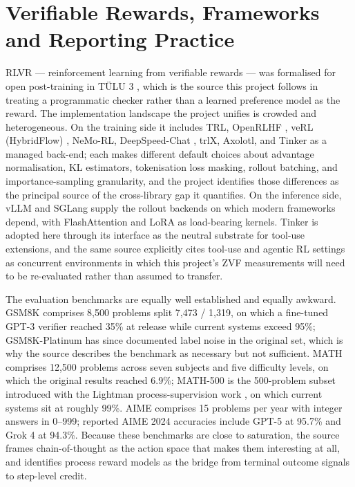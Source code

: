\documentclass[12pt,a4paper]{report}
\DeclareRobustCommand{\longtok}[1]{\texttt{\seqsplit{#1}}}
\begin{document}
\section{Verifiable Rewards, Frameworks and Reporting
Practice}\label{verifiable-rewards-frameworks-and-reporting-practice}

RLVR --- reinforcement learning from verifiable rewards --- was
formalised for open post-training in TÜLU 3 \citep{lambert2024tulu3},
which is the source this project follows in treating a programmatic
checker rather than a learned preference model as the reward. The
implementation landscape the project unifies is crowded and
heterogeneous. On the training side it includes TRL, OpenRLHF
\citep{hu2024openrlhf}, veRL (HybridFlow) \citep{sheng2025hybridflow},
NeMo-RL, DeepSpeed-Chat \citep{yao2023deepspeedchat}, trlX, Axolotl, and
Tinker as a managed back-end; each makes different default choices about
advantage normalisation, KL estimators, tokenisation loss masking,
rollout batching, and importance-sampling granularity, and the project
identifies those differences as the principal source of the
cross-library gap it quantifies. On the inference side, vLLM
\citep{kwon2023vllm} and SGLang \citep{zheng2024sglang} supply the
rollout backends on which modern frameworks depend, with FlashAttention
\citep{dao2022flashattention} and LoRA \citep{hu2021lora} as
load-bearing kernels. Tinker is adopted here through its
\longtok{message\_\allowbreak{}with\_\allowbreak{}tool} interface as the neutral substrate for
tool-use extensions, and the same source explicitly cites tool-use and
agentic RL settings as concurrent environments in which this project's
ZVF measurements will need to be re-evaluated rather than assumed to
transfer.

The evaluation benchmarks are equally well established and equally
awkward. GSM8K \citep{cobbe2021gsm8k} comprises 8,500 problems split
7,473 / 1,319, on which a fine-tuned GPT-3 verifier reached 35\% at
release while current systems exceed 95\%; GSM8K-Platinum
\citep{vendrow2025platinum} has since documented label noise in the
original set, which is why the source describes the benchmark as
necessary but not sufficient. MATH \citep{hendrycks2021math} comprises
12,500 problems across seven subjects and five difficulty levels, on
which the original results reached 6.9\%; MATH-500 is the 500-problem
subset introduced with the Lightman process-supervision work
\citep{lightman2023lets}, on which current systems sit at roughly 99\%.
AIME comprises 15 problems per year with integer answers in 0--999;
reported AIME 2024 accuracies include GPT-5 at 95.7\% and Grok 4 at
94.3\%. Because these benchmarks are close to saturation, the source
frames chain-of-thought as the action space that makes them interesting
at all, and identifies process reward models as the bridge from terminal
outcome signals to step-level credit.
\end{document}
